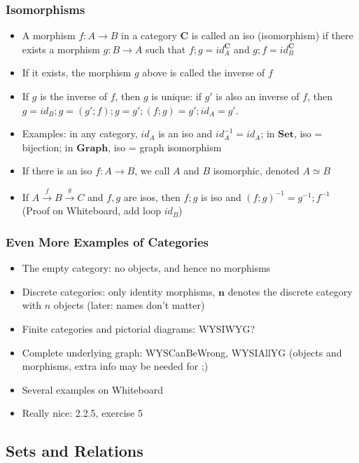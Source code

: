 \documentclass[handout]{beamer}
\newcommand{\bfsf}[1]{{\boldsymbol{#1}}}
\newcommand{\Set}{\bfsf{Set}}
\newcommand{\Gra}{\bfsf{Graph}}
\newcommand{\CC}{\bfsf{C}}
\begin{document}
\frame
  {   
    \frametitle{Isomorphisms}\label{Ch2:Isos}

 \begin{itemize}[<+->]
\item A morphism $f : A\to B$ in a category $\CC$ is called an iso (isomorphism)
if there exists a morphism $g : B\to A$ such that $f;g = id^\CC_A$ and
$g;f = id^\CC_B$
\item If it exists, the morphism $g$ above is called the inverse of $f$
\item If $g$ is the inverse of $f$, then $g$ is unique: if $g'$ is also
an inverse of $f$, then $g = id_B;g = (g';f);g = g';(f;g) = g';id_A = g'$.
\item Examples: in any category, $id_A$ is an iso and $id_A^{-1} = id_A$;
in $\Set$, iso = bijection; in $\Gra$, iso = graph isomorphism
\item If there is an iso $f: A\to B$, we call $A$ and $B$ isomorphic, 
denoted $A\simeq B$
\item If  $A \stackrel{f}{\to} B \stackrel{g}{\to} C$ and $f,g$ are isos, then
$f;g$ is iso and $(f;g)^{-1} = g^{-1}; f^{-1}$
(Proof on Whiteboard, add loop $id_B$)
 \end{itemize}

 }

\frame
  {   
    \frametitle{Even More Examples of Categories}\label{Ch2:evenMoreExaCat}

 \begin{itemize}[<+->]
\item The empty category: no objects, and hence no morphisms
\item Discrete categories: only identity morphisms, $\bfsf{n}$ denotes
the discrete category with $n$ objects (later: names don't matter)
\item Finite categories and pictorial diagrams: WYSIWYG?
\item Complete underlying graph: WYSCanBeWrong, WYSIAllYG (objects and morphisms,
extra info may be needed for ;)
\item Several examples on Whiteboard
\item Really nice: 2.2.5, exercise 5
 \end{itemize}

 }


\subsection{Sets and Relations}
\end{document}
